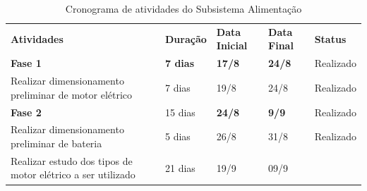 \begin{table}[!htbp]
 \centering
 \caption{Cronograma de atividades do Subsistema Alimentação} \label{tab:cronograma_ali}
 {\renewcommand\arraystretch{1.25}
 \begin{tabular}{ l l l l l }
  \cline{1-1}\cline{2-2}\cline{3-3}\cline{4-4}\cline{5-5}  
    \multicolumn{1}{|p{6.367cm}|}{\textbf{Atividades}} &
    \multicolumn{1}{p{1.750cm}|}{\textbf{Duração}} &
    \multicolumn{1}{p{1.267cm}|}{\textbf{Data Inicial}} &
    \multicolumn{1}{p{1.233cm}|}{\textbf{Data Final}} &
    \multicolumn{1}{p{1.917cm}|}{\textbf{Status}}
  \\  
  \cline{1-1}\cline{2-2}\cline{3-3}\cline{4-4}\cline{5-5}  
    \multicolumn{1}{|p{6.367cm}|}{\textbf{Fase 1}} &
    \multicolumn{1}{p{1.750cm}|}{\textbf{7 dias}} &
    \multicolumn{1}{p{1.267cm}|}{\textbf{17/8}} &
    \multicolumn{1}{p{1.233cm}|}{\textbf{24/8}} &
    \multicolumn{1}{p{1.917cm}|}{Realizado}
  \\  
  \cline{1-1}\cline{2-2}\cline{3-3}\cline{4-4}\cline{5-5}  
    \multicolumn{1}{|p{6.367cm}|}{Realizar dimensionamento preliminar de motor elétrico} &
    \multicolumn{1}{p{1.750cm}|}{7 dias} &
    \multicolumn{1}{p{1.267cm}|}{19/8} &
    \multicolumn{1}{p{1.233cm}|}{24/8} &
    \multicolumn{1}{p{1.917cm}|}{Realizado}
  \\  
  \cline{1-1}\cline{2-2}\cline{3-3}\cline{4-4}\cline{5-5}  
    \multicolumn{1}{|p{6.367cm}|}{\textbf{Fase 2}} &
    \multicolumn{1}{p{1.750cm}|}{15 dias} &
    \multicolumn{1}{p{1.267cm}|}{\textbf{24/8}} &
    \multicolumn{1}{p{1.233cm}|}{\textbf{9/9}} &
    \multicolumn{1}{p{1.917cm}|}{Realizado}
  \\  
  \cline{1-1}\cline{2-2}\cline{3-3}\cline{4-4}\cline{5-5}  
    \multicolumn{1}{|p{6.367cm}|}{Realizar dimensionamento preliminar de bateria} &
    \multicolumn{1}{p{1.750cm}|}{5 dias} &
    \multicolumn{1}{p{1.267cm}|}{26/8} &
    \multicolumn{1}{p{1.233cm}|}{31/8} &
    \multicolumn{1}{p{1.917cm}|}{Realizado}
  \\  
  \cline{1-1}\cline{2-2}\cline{3-3}\cline{4-4}\cline{5-5}  
    \multicolumn{1}{|p{6.367cm}|}{Realizar estudo dos tipos de motor elétrico a ser utilizado} &
    \multicolumn{1}{p{1.750cm}|}{21 dias} &
    \multicolumn{1}{p{1.267cm}|}{19/9} &
    \multicolumn{1}{p{1.233cm}|}{09/9} &
    \multicolumn{1}{p{1.917cm}|}{   			

}
\end{tabular}}
\end{table}
